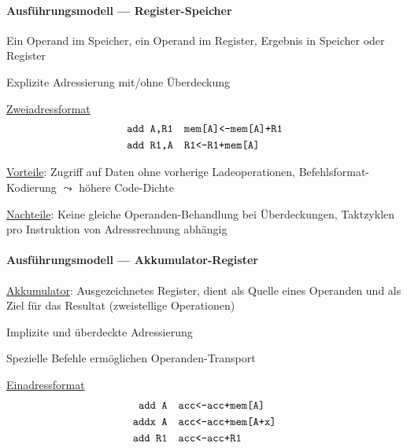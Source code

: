 \paragraph{Ausführungsmodell --- Register-Speicher}
\begin{items}
	\item Ein Operand im Speicher, ein Operand im Register, Ergebnis in Speicher oder Register
	\item Explizite Adressierung mit/ohne Überdeckung
	\item \underline{Zweiadressformat}
	\begin{align*}
		\text{\code{add A,R1}} &\quad \text{\code{mem[A]<-mem[A]+R1}} \\
		\text{\code{add R1,A}} &\quad \text{\code{R1<-R1+mem[A]}}
	\end{align*}
	\item \underline{Vorteile}: Zugriff auf Daten ohne vorherige Ladeoperationen, Befehlsformat-Kodierung $\leadsto$ höhere Code-Dichte
	\item \underline{Nachteile}: Keine gleiche Operanden-Behandlung bei Überdeckungen, Taktzyklen pro Instruktion von Adressrechnung abhängig
\end{items}

\newpage

\paragraph{Ausführungsmodell --- Akkumulator-Register}
\begin{items}
	\item \underline{Akkumulator}: Ausgezeichnetes Register, dient als Quelle eines Operanden und als Ziel für das Resultat (zweistellige Operationen)
	\item Implizite und überdeckte Adressierung
	\item Spezielle Befehle ermöglichen Operanden-Transport
	\item \underline{Einadressformat}
	\begin{align*}
		\text{\code{add A}} &\quad \text{\code{acc<-acc+mem[A]}} \\
		\text{\code{addx A}} &\quad \text{\code{acc<-acc+mem[A+x]}} \\
		\text{\code{add R1}} &\quad \text{\code{acc<-acc+R1}}
	\end{align*}
\end{items}

